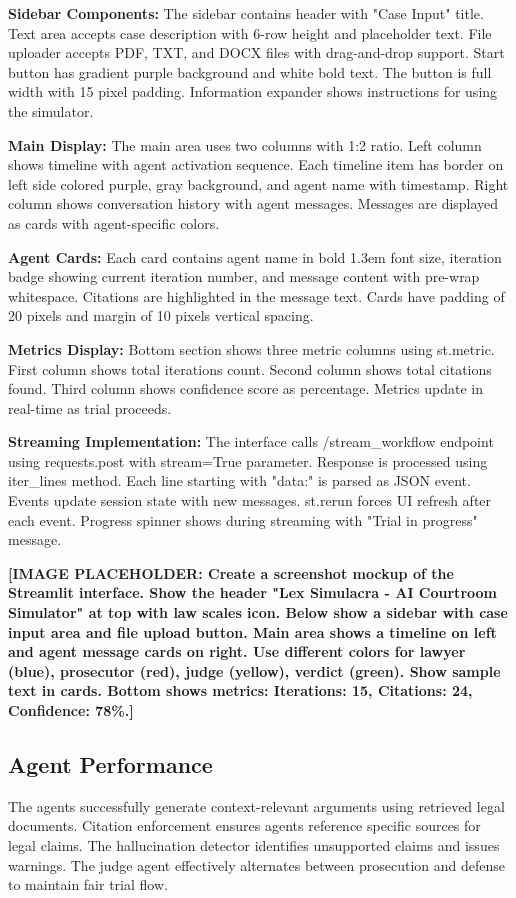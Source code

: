 \documentclass[12pt,singleside,a4paper]{article}
\begin{document}
\textbf{Sidebar Components:} The sidebar contains header with "Case Input" title. Text area accepts case description with 6-row height and placeholder text. File uploader accepts PDF, TXT, and DOCX files with drag-and-drop support. Start button has gradient purple background and white bold text. The button is full width with 15 pixel padding. Information expander shows instructions for using the simulator.

\textbf{Main Display:} The main area uses two columns with 1:2 ratio. Left column shows timeline with agent activation sequence. Each timeline item has border on left side colored purple, gray background, and agent name with timestamp. Right column shows conversation history with agent messages. Messages are displayed as cards with agent-specific colors.

\textbf{Agent Cards:} Each card contains agent name in bold 1.3em font size, iteration badge showing current iteration number, and message content with pre-wrap whitespace. Citations are highlighted in the message text. Cards have padding of 20 pixels and margin of 10 pixels vertical spacing.

\textbf{Metrics Display:} Bottom section shows three metric columns using st.metric. First column shows total iterations count. Second column shows total citations found. Third column shows confidence score as percentage. Metrics update in real-time as trial proceeds.

\textbf{Streaming Implementation:} The interface calls /stream\_workflow endpoint using requests.post with stream=True parameter. Response is processed using iter\_lines method. Each line starting with "data:" is parsed as JSON event. Events update session state with new messages. st.rerun forces UI refresh after each event. Progress spinner shows during streaming with "Trial in progress" message.

\textbf{[IMAGE PLACEHOLDER: Create a screenshot mockup of the Streamlit interface. Show the header "Lex Simulacra - AI Courtroom Simulator" at top with law scales icon. Below show a sidebar with case input area and file upload button. Main area shows a timeline on left and agent message cards on right. Use different colors for lawyer (blue), prosecutor (red), judge (yellow), verdict (green). Show sample text in cards. Bottom shows metrics: Iterations: 15, Citations: 24, Confidence: 78\%.]}

\subsection{Agent Performance}
The agents successfully generate context-relevant arguments using retrieved legal documents. Citation enforcement ensures agents reference specific sources for legal claims. The hallucination detector identifies unsupported claims and issues warnings. The judge agent effectively alternates between prosecution and defense to maintain fair trial flow.
\end{document}

